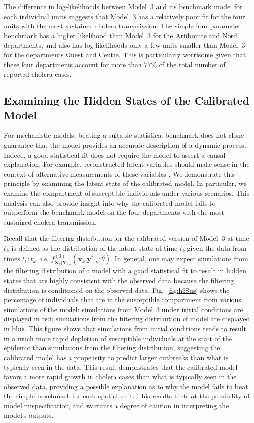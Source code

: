The difference in log-likelihoods between Model~3 and its benchmark model for each individual units suggests that Model~3 has a relatively poor fit for the four units with the most sustained cholera transmission.
The simple four parameter benchmark has a higher likelihood than Model~3 for the Artibonite and Nord departments, and also has log-likelihoods only a few units smaller than Model~3 for the departments Ouest and Centre.
This is particularly worrisome given that these four departments account for more than $77\%$ of the total number of reported cholera cases.

\subsection{Examining the Hidden States of the Calibrated Model}

For mechanistic models, beating a suitable statistical benchmark does not alone guarantee that the model provides an accurate description of a dynamic process.
Indeed, a good statistical fit does not require the model to assert a causal explanation.
For example, reconstructed latent variables should make sense in the context of alternative measurements of these variables \cite{grad12}.
We demonstrate this principle by examining the latent state of the calibrated model.
In particular, we examine the compartment of susceptible individuals under various scenarios.
This analysis can also provide insight into why the calibrated model fails to outperform the benchmark model on the four departments with the most sustained cholera transmission.

Recall that the filtering distribution for the calibrated version of Model~3 at time $t_k$ is defined as the distribution of the latent state at time $t_k$ given the data from times $t_{1}:t_{k}$, i.e. $f^{(3)}_{\bm{X}_k|\bm{Y}_{1:k}}(\bm{x}_{k} | \bm{y}^*_{1:k} ; \hat\theta)$.
In general, one may expect simulations from the filtering distribution of a model with a good statistical fit to result in hidden states that are highly consistent with the observed data because the filtering distribution is conditioned on the observed data.
Fig.~\ref{fig:h3Sus} shows the percentage of individuals that are in the susceptible compartment from various simulations of the model:
simulations from Model~3 under initial conditions are displayed in red; simulations from the filtering distribution of model are displayed in blue.
This figure shows that simulations from initial conditions tends to result in a much more rapid depletion of susceptible individuals at the start of the epidemic than simulations from the filtering distribution, suggesting the calibrated model has a propensity to predict larger outbreaks than what is typically seen in the data.
This result demonstrates that the calibrated model favors a more rapid growth in cholera cases than what is typically seen in the observed data, providing a possible explanation as to why the model fails to beat the simple benchmark for each spatial unit.
This results hints at the possibility of model mispecification, and warrants a degree of caution in interpreting the model's outputs.



